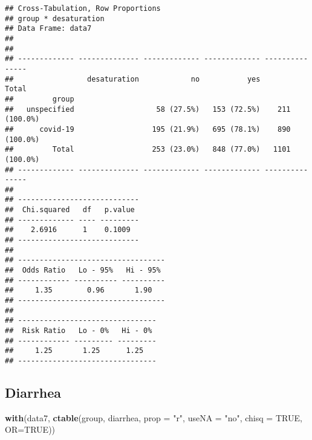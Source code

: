 \documentclass[
]{article}
\newenvironment{Shaded}{\begin{snugshade}}{\end{snugshade}}
\newcommand{\DataTypeTok}[1]{\textcolor[rgb]{0.13,0.29,0.53}{#1}}
\newcommand{\KeywordTok}[1]{\textcolor[rgb]{0.13,0.29,0.53}{\textbf{#1}}}
\newcommand{\NormalTok}[1]{#1}
\newcommand{\OtherTok}[1]{\textcolor[rgb]{0.56,0.35,0.01}{#1}}
\newcommand{\StringTok}[1]{\textcolor[rgb]{0.31,0.60,0.02}{#1}}
\begin{document}
\begin{verbatim}
## Cross-Tabulation, Row Proportions  
## group * desaturation  
## Data Frame: data7  
## 
## 
## ------------- -------------- ------------- ------------- ---------------
##                 desaturation            no           yes           Total
##         group                                                           
##   unspecified                   58 (27.5%)   153 (72.5%)    211 (100.0%)
##      covid-19                  195 (21.9%)   695 (78.1%)    890 (100.0%)
##         Total                  253 (23.0%)   848 (77.0%)   1101 (100.0%)
## ------------- -------------- ------------- ------------- ---------------
## 
## ----------------------------
##  Chi.squared   df   p.value 
## ------------- ---- ---------
##    2.6916      1    0.1009  
## ----------------------------
## 
## ----------------------------------
##  Odds Ratio   Lo - 95%   Hi - 95% 
## ------------ ---------- ----------
##     1.35        0.96       1.90   
## ----------------------------------
## 
## --------------------------------
##  Risk Ratio   Lo - 0%   Hi - 0% 
## ------------ --------- ---------
##     1.25       1.25      1.25   
## --------------------------------
\end{verbatim}

\hypertarget{diarrhea}{%
\subsection{Diarrhea}\label{diarrhea}}

\begin{Shaded}
\begin{Highlighting}[]
\KeywordTok{with}\NormalTok{(data7, }\KeywordTok{ctable}\NormalTok{(group, diarrhea, }\DataTypeTok{prop =} \StringTok{"r"}\NormalTok{, }\DataTypeTok{useNA =} \StringTok{"no"}\NormalTok{, }\DataTypeTok{chisq =} \OtherTok{TRUE}\NormalTok{, }\DataTypeTok{OR=}\OtherTok{TRUE}\NormalTok{))}
\end{Highlighting}
\end{Shaded}
\end{document}
